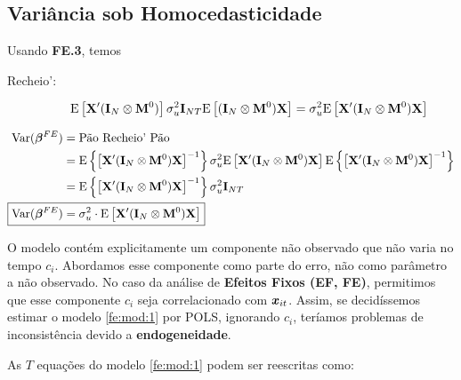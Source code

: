 \documentclass[11pt, oneside, a4paper, article]{article}
\numberwithin{equation}{section}
\begin{document}
\subsection{Variância sob Homocedasticidade}

Usando \textbf{FE.3}, temos

\begin{description}
\item [Recheio':]
\begin{align*}
\text{E} \left[ \mathbf{X}' ( \mathbf{I}_{N} \otimes \mathbf{M}^{0} ) \right]
\sigma^2_{u} \mathbf{I}_{NT}
\text{E} \left[ ( \mathbf{I}_{N} \otimes \mathbf{M}^{0} ) \mathbf{X} \right]
=
\sigma^2_{u}
\text{E} \left[ \mathbf{X}' ( \mathbf{I}_{N} \otimes \mathbf{M}^{0} ) \mathbf{X} \right]
\end{align*}
\end{description}

\noindent
{}

\vspace{-2 em}
\begin{align*}
\Var( \betavec^{FE} ) &= \text{Pão Recheio' Pão} 
\\ &=
\E \left\{ \left[
\Xmat' ( \Imat_{N} \otimes \Mzero ) \Xmat
\right]^{-1} \right\}
\sigma_{u}^{2} \E\left[ \Xmat' ( \Imat_{N} \otimes \Mzero ) \Xmat \right]
\E \left\{ \left[
\Xmat' ( \Imat_{N} \otimes \Mzero ) \Xmat
\right]^{-1} \right\}
\\  &=
\E \left\{ \left[
\Xmat' ( \Imat_{N} \otimes \Mzero ) \Xmat
\right]^{-1} \right\}
\sigma_{u}^{2} \Imat_{NT}
\\
\Aboxed{ \Var( \betavec^{FE} ) &= \sigma_{u}^{2} \cdot  \E\left[ \Xmat' ( \Imat_{N} \otimes \Mzero ) \Xmat \right] }
\end{align*}


O modelo contém explicitamente um componente não observado que não varia no tempo $c_{i}$.
Abordamos esse componente como parte do erro, não como parâmetro a não observado.
No caso da análise de \textbf{Efeitos Fixos (EF, FE)}, permitimos que esse componente $c_{i}$ seja correlacionado com $\boldsymbol{x}_{it}$.
Assim, se decidíssemos estimar o modelo \eqref{fe:mod:1} por POLS, ignorando $c_{i}$, teríamos problemas de inconsistência devido a \textbf{endogeneidade}.

As $T$ equações do modelo \eqref{fe:mod:1} podem ser reescritas como:
\end{document}
